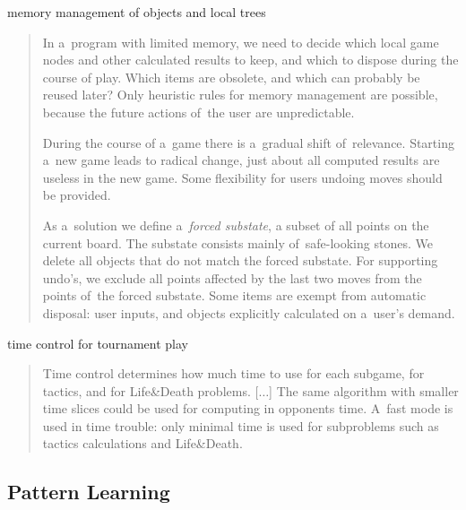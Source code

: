 \begin{enumerate}[(a)]
  \item memory management of objects and local trees
    \begin{quotation} \noindent
      In a~program with limited memory, we need to decide which local game nodes and other calculated results to keep, and which to dispose during the course of play.
      Which items are obsolete, and which can probably be reused later?
      Only heuristic rules for memory management are possible, because the future actions of~the user are unpredictable.

      During the course of a~game there is a~gradual shift of~relevance.
      Starting a~new game leads to radical change, just about all computed results are useless in the new game.
      Some flexibility for users undoing moves should be provided.

      As a~solution we define a~\emph{forced substate}, a subset of all points on the current board.
      The substate consists mainly of~safe-looking stones.
      We delete all objects that do not match the forced substate.
      For supporting undo’s, we exclude all points affected by the last two moves from the points of~the forced substate.
      Some items are exempt from automatic disposal:
      user inputs, and objects explicitly calculated on a~user’s demand.
    \end{quotation}

    \parbox{.9\textwidth}{
    \item time control for tournament play
      \begin{quotation} \noindent
        Time control determines how much time to use for each subgame, for tactics, and for
        Life\&Death problems. [$\dots$]
        The same algorithm with smaller time slices could be used for computing in opponents time.
        A~fast mode is used in time trouble:
        only minimal time is used for subproblems such as tactics calculations and Life\&Death.
      \end{quotation}
    }

\end{enumerate}

\subsection{Pattern Learning}


